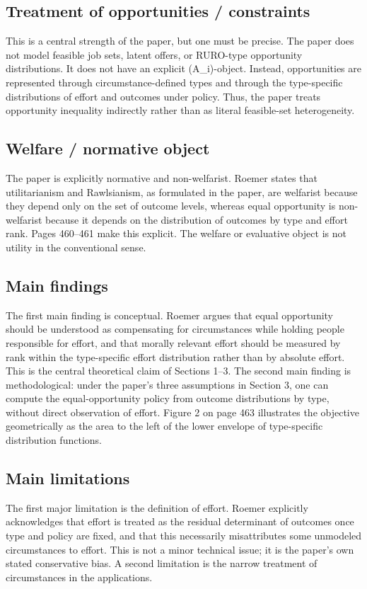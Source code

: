 \documentclass[11pt,a4paper]{article}
\begin{document}
\subsection*{Treatment of opportunities / constraints}
This is a central strength of the paper, but one must be precise. The paper does not model feasible job sets, latent offers, or RURO-type opportunity distributions. It does not have an explicit (A\_i)-object. Instead, opportunities are represented through circumstance-defined types and through the type-specific distributions of effort and outcomes under policy. Thus, the paper treats opportunity inequality indirectly rather than as literal feasible-set heterogeneity.

\subsection*{Welfare / normative object}
The paper is explicitly normative and non-welfarist. Roemer states that utilitarianism and Rawlsianism, as formulated in the paper, are welfarist because they depend only on the set of outcome levels, whereas equal opportunity is non-welfarist because it depends on the distribution of outcomes by type and effort rank. Pages 460–461 make this explicit. The welfare or evaluative object is not utility in the conventional sense.

\subsection*{Main findings}
The first main finding is conceptual. Roemer argues that equal opportunity should be understood as compensating for circumstances while holding people responsible for effort, and that morally relevant effort should be measured by rank within the type-specific effort distribution rather than by absolute effort. This is the central theoretical claim of Sections 1–3. The second main finding is methodological: under the paper’s three assumptions in Section 3, one can compute the equal-opportunity policy from outcome distributions by type, without direct observation of effort. Figure 2 on page 463 illustrates the objective geometrically as the area to the left of the lower envelope of type-specific distribution functions.

\subsection*{Main limitations}
The first major limitation is the definition of effort. Roemer explicitly acknowledges that effort is treated as the residual determinant of outcomes once type and policy are fixed, and that this necessarily misattributes some unmodeled circumstances to effort. This is not a minor technical issue; it is the paper’s own stated conservative bias. A second limitation is the narrow treatment of circumstances in the applications.
\end{document}
